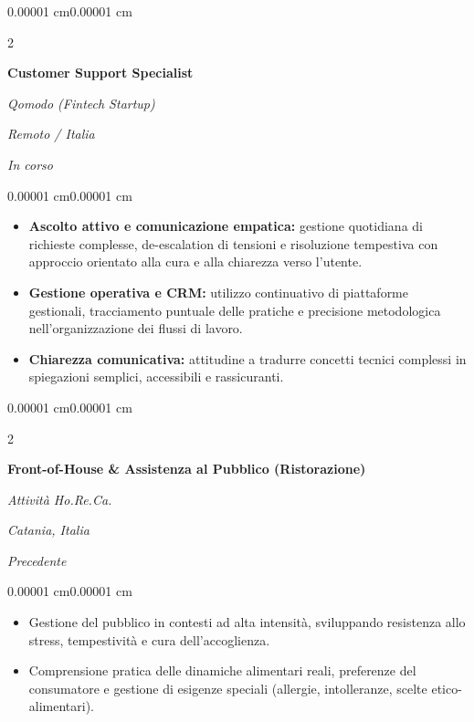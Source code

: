 \documentclass[10pt, letterpaper]{article}
\newenvironment{highlights}{
    \begin{itemize}[
        topsep=0.06 cm,
        parsep=0.04 cm,
        partopsep=0pt,
        itemsep=0pt,
        leftmargin=0.4 cm + 10pt
    ]
}{
    \end{itemize}
}
\newenvironment{onecolentry}{
    \begin{adjustwidth}{0.00001 cm}{0.00001 cm}
}{
    \end{adjustwidth}
}
\newenvironment{twocolentry}[2][]{
    \onecolentry
    \def\secondColumn{#2}
    \setcolumnwidth{\fill, 6.0 cm}
    \begin{paracol}{2}
}{
    \switchcolumn \raggedleft \secondColumn
    \end{paracol}
    \endonecolentry
}
\begin{document}
        \begin{twocolentry}{
            \textit{Remoto / Italia}\vspace{0 cm}
            
            \textit{In corso}
        }
            \textbf{Customer Support Specialist}\vspace{0 cm}
            
            \textit{Qomodo (Fintech Startup)}
        \end{twocolentry}
        \vspace{0.1 cm}
        \begin{onecolentry}
            \begin{highlights}
                \item \textbf{Ascolto attivo e comunicazione empatica:} gestione quotidiana di richieste complesse, de-escalation di tensioni e risoluzione tempestiva con approccio orientato alla cura e alla chiarezza verso l'utente.
                \item \textbf{Gestione operativa e CRM:} utilizzo continuativo di piattaforme gestionali, tracciamento puntuale delle pratiche e precisione metodologica nell'organizzazione dei flussi di lavoro.
                \item \textbf{Chiarezza comunicativa:} attitudine a tradurre concetti tecnici complessi in spiegazioni semplici, accessibili e rassicuranti.
            \end{highlights}
        \end{onecolentry}

        \vspace{0.25 cm}

        \begin{twocolentry}{
            \textit{Catania, Italia}\vspace{0 cm}
            
            \textit{Precedente}
        }
            \textbf{Front-of-House \& Assistenza al Pubblico (Ristorazione)}\vspace{0 cm}
            
            \textit{Attività Ho.Re.Ca.}
        \end{twocolentry}
        \vspace{0.1 cm}
        \begin{onecolentry}
            \begin{highlights}
                \item Gestione del pubblico in contesti ad alta intensità, sviluppando resistenza allo stress, tempestività e cura dell'accoglienza.
                \item Comprensione pratica delle dinamiche alimentari reali, preferenze del consumatore e gestione di esigenze speciali (allergie, intolleranze, scelte etico-alimentari).
            \end{highlights}
        \end{onecolentry}
\end{document}
